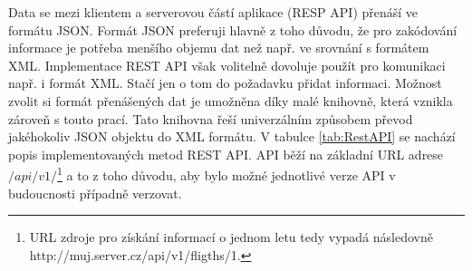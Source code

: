 \documentclass[ing,male,java,dept460]{diploma}						%
\begin{document}
Data se mezi klientem a serverovou částí aplikace (RESP API) přenáší ve formátu JSON. Formát JSON preferuji hlavně z toho důvodu, že pro zakódování informace je potřeba menšího objemu dat než např. ve srovnání s formátem XML. Implementace REST API však volitelně dovoluje použít pro komunikaci např. i formát XML. Stačí jen o tom do požadavku přidat informaci. Možnost zvolit si formát přenášených dat je umožněna díky malé knihovně, která vznikla zároveň s touto prací. Tato knihovna řeší univerzálním způsobem převod jakéhokoliv JSON objektu do XML formátu. V tabulce \ref{tab:RestAPI} se nachází popis implementovaných metod REST API. API běží na základní URL adrese $/api/v1/$\footnote{URL zdroje pro získání informací o jednom letu tedy vypadá následovně http://muj.server.cz/api/v1/fligths/1.} a to z toho důvodu, aby bylo možné jednotlivé verze API v budoucnosti případně verzovat.
\end{document}
